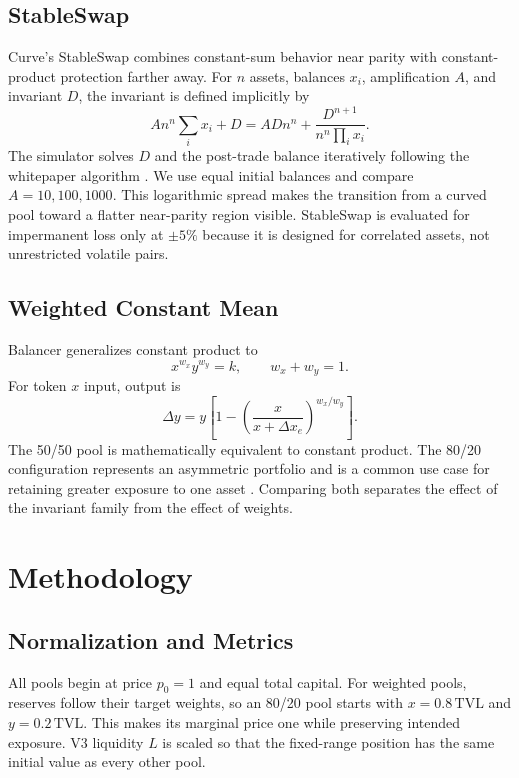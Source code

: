 \documentclass[11pt,twocolumn]{article}
\newcommand{\pct}[1]{#1\%}
\begin{document}
\subsection{StableSwap}

Curve's StableSwap combines constant-sum behavior near parity with
constant-product protection farther away. For $n$ assets, balances $x_i$,
amplification $A$, and invariant $D$, the invariant is defined implicitly by
\begin{equation}
A n^n \sum_i x_i + D =
A D n^n + \frac{D^{n+1}}{n^n\prod_i x_i}.
\end{equation}
The simulator solves $D$ and the post-trade balance iteratively following the
whitepaper algorithm \cite{curve}. We use equal initial balances and compare
$A=10,100,1000$. This logarithmic spread makes the transition from a curved
pool toward a flatter near-parity region visible. StableSwap is evaluated for
impermanent loss only at $\pm\pct{5}$ because it is designed for correlated
assets, not unrestricted volatile pairs.

\subsection{Weighted Constant Mean}

Balancer generalizes constant product to
\begin{equation}
x^{w_x}y^{w_y}=k,\qquad w_x+w_y=1.
\end{equation}
For token $x$ input, output is
\begin{equation}
\Delta y=y\left[1-\left(\frac{x}{x+\Delta x_e}\right)^{w_x/w_y}\right].
\end{equation}
The 50/50 pool is mathematically equivalent to constant product. The 80/20
configuration represents an asymmetric portfolio and is a common use case for
retaining greater exposure to one asset \cite{balancer}. Comparing both
separates the effect of the invariant family from the effect of weights.

\section{Methodology}

\subsection{Normalization and Metrics}

All pools begin at price $p_0=1$ and equal total capital. For weighted pools,
reserves follow their target weights, so an 80/20 pool starts with
$x=0.8\,\mathrm{TVL}$ and $y=0.2\,\mathrm{TVL}$. This makes its marginal price
one while preserving intended exposure. V3 liquidity $L$ is scaled so that
the fixed-range position has the same initial value as every other pool.
\end{document}
